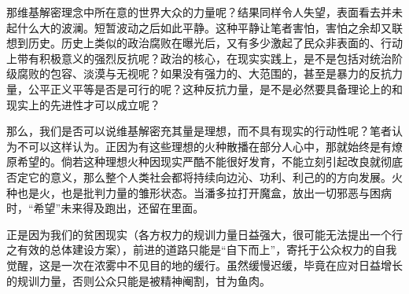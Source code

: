 那维基解密理念中所在意的世界大众的力量呢？结果同样令人失望，表面看去并未起什么大的波澜。短暂波动之后如此平静。这种平静让笔者害怕，害怕之余却又联想到历史。历史上类似的政治腐败在曝光后，又有多少激起了民众非表面的、行动上带有积极意义的强烈反抗呢？政治的核心，在现实实践上，是不是包括对统治阶级腐败的包容、淡漠与无视呢？如果没有强力的、大范围的，甚至是暴力的反抗力量，公平正义平等是否是可行的呢？这种反抗力量，是不是必然要具备理论上的和现实上的先进性才可以成立呢？

那么，我们是否可以说维基解密充其量是理想，而不具有现实的行动性呢？笔者认为不可以这样认为。正因为有这些理想的火种散播在部分人心中，那就始终是有燎原希望的。倘若这种理想火种因现实严酷不能很好发育，不能立刻引起改良就彻底否定它的意义，那么整个人类社会都将持续向边沁、功利、利己的的方向发展。火种也是火，也是批判力量的雏形状态。当潘多拉打开魔盒，放出一切邪恶与困病时，“希望”未来得及跑出，还留在里面。

正是因为我们的贫困现实（各方权力的规训力量日益强大，很可能无法提出一个行之有效的总体建设方案），前进的道路只能是“自下而上”，寄托于公众权力的自我觉醒，这是一次在浓雾中不见目的地的缓行。虽然缓慢迟缓，毕竟在应对日益增长的规训力量，否则公众只能是被精神阉割，甘为鱼肉。


